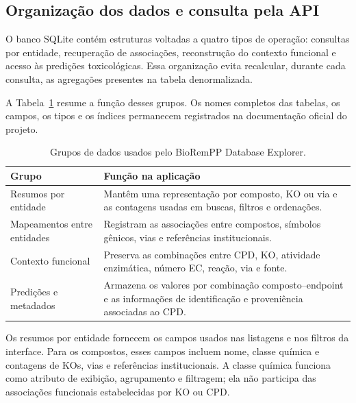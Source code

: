\subsection{Organização dos dados e consulta pela API}

O banco SQLite contém estruturas voltadas a quatro tipos de operação:
consultas por entidade, recuperação de associações, reconstrução do contexto
funcional e acesso às predições toxicológicas. Essa organização evita
recalcular, durante cada consulta, as agregações presentes na tabela
denormalizada.

A Tabela~\ref{tab:c2-data-groups} resume a função desses grupos. Os nomes
completos das tabelas, os campos, os tipos e os índices permanecem registrados
na documentação oficial do projeto.

\begin{table}[htbp]
\centering
\caption{Grupos de dados usados pelo BioRemPP Database Explorer.}
\label{tab:c2-data-groups}
\small
\begin{tabularx}{\textwidth}{@{}p{3.8cm}X@{}}
\toprule
\textbf{Grupo} & \textbf{Função na aplicação} \\
\midrule

Resumos por entidade
& Mantêm uma representação por composto, KO ou via e as contagens usadas em
buscas, filtros e ordenações. \\

Mapeamentos entre entidades
& Registram as associações entre compostos, símbolos gênicos, vias e
referências institucionais. \\

Contexto funcional
& Preserva as combinações entre CPD, KO, atividade enzimática, número EC,
reação, via e fonte. \\

Predições e metadados
& Armazena os valores por combinação composto--endpoint e as informações de
identificação e proveniência associadas ao CPD. \\

\bottomrule
\end{tabularx}
\end{table}

Os resumos por entidade fornecem os campos usados nas listagens e nos filtros
da interface. Para os compostos, esses campos incluem nome, classe química e
contagens de KOs, vias e referências institucionais. A classe química funciona
como atributo de exibição, agrupamento e filtragem; ela não participa das
associações funcionais estabelecidas por KO ou CPD.

